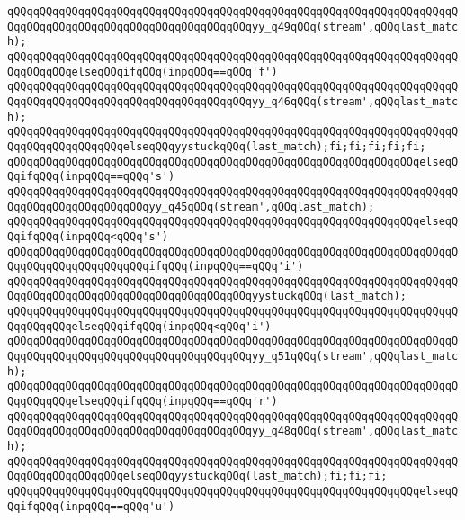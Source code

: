 \verb|qQQqqQQqqQQqqQQqqQQqqQQqqQQqqQQqqQQqqQQqqQQqqQQqqQQqqQQqqQQqqQQqqQQqqQQqqQQqqQQqqQQqqQQqqQQqqQQqqQQqqQQqqQQqyy_q49qQQq(stream',qQQqlast_match);|\newline
\verb|qQQqqQQqqQQqqQQqqQQqqQQqqQQqqQQqqQQqqQQqqQQqqQQqqQQqqQQqqQQqqQQqqQQqqQQqqQQqqQQqelseqQQqifqQQq(inpqQQq==qQQq'f')|\newline
\verb|qQQqqQQqqQQqqQQqqQQqqQQqqQQqqQQqqQQqqQQqqQQqqQQqqQQqqQQqqQQqqQQqqQQqqQQqqQQqqQQqqQQqqQQqqQQqqQQqqQQqqQQqqQQqyy_q46qQQq(stream',qQQqlast_match);|\newline
\verb|qQQqqQQqqQQqqQQqqQQqqQQqqQQqqQQqqQQqqQQqqQQqqQQqqQQqqQQqqQQqqQQqqQQqqQQqqQQqqQQqqQQqqQQqelseqQQqyystuckqQQq(last_match);fi;fi;fi;fi;fi;|\newline
\verb|qQQqqQQqqQQqqQQqqQQqqQQqqQQqqQQqqQQqqQQqqQQqqQQqqQQqqQQqqQQqqQQqelseqQQqifqQQq(inpqQQq==qQQq's')|\newline
\verb|qQQqqQQqqQQqqQQqqQQqqQQqqQQqqQQqqQQqqQQqqQQqqQQqqQQqqQQqqQQqqQQqqQQqqQQqqQQqqQQqqQQqqQQqqQQqyy_q45qQQq(stream',qQQqlast_match);|\newline
\verb|qQQqqQQqqQQqqQQqqQQqqQQqqQQqqQQqqQQqqQQqqQQqqQQqqQQqqQQqqQQqqQQqelseqQQqifqQQq(inpqQQq<qQQq's')|\newline
\verb|qQQqqQQqqQQqqQQqqQQqqQQqqQQqqQQqqQQqqQQqqQQqqQQqqQQqqQQqqQQqqQQqqQQqqQQqqQQqqQQqqQQqqQQqqQQqifqQQq(inpqQQq==qQQq'i')|\newline
\verb|qQQqqQQqqQQqqQQqqQQqqQQqqQQqqQQqqQQqqQQqqQQqqQQqqQQqqQQqqQQqqQQqqQQqqQQqqQQqqQQqqQQqqQQqqQQqqQQqqQQqqQQqqQQqyystuckqQQq(last_match);|\newline
\verb|qQQqqQQqqQQqqQQqqQQqqQQqqQQqqQQqqQQqqQQqqQQqqQQqqQQqqQQqqQQqqQQqqQQqqQQqqQQqqQQqelseqQQqifqQQq(inpqQQq<qQQq'i')|\newline
\verb|qQQqqQQqqQQqqQQqqQQqqQQqqQQqqQQqqQQqqQQqqQQqqQQqqQQqqQQqqQQqqQQqqQQqqQQqqQQqqQQqqQQqqQQqqQQqqQQqqQQqqQQqqQQqyy_q51qQQq(stream',qQQqlast_match);|\newline
\verb|qQQqqQQqqQQqqQQqqQQqqQQqqQQqqQQqqQQqqQQqqQQqqQQqqQQqqQQqqQQqqQQqqQQqqQQqqQQqqQQqelseqQQqifqQQq(inpqQQq==qQQq'r')|\newline
\verb|qQQqqQQqqQQqqQQqqQQqqQQqqQQqqQQqqQQqqQQqqQQqqQQqqQQqqQQqqQQqqQQqqQQqqQQqqQQqqQQqqQQqqQQqqQQqqQQqqQQqqQQqqQQqyy_q48qQQq(stream',qQQqlast_match);|\newline
\verb|qQQqqQQqqQQqqQQqqQQqqQQqqQQqqQQqqQQqqQQqqQQqqQQqqQQqqQQqqQQqqQQqqQQqqQQqqQQqqQQqqQQqqQQqelseqQQqyystuckqQQq(last_match);fi;fi;fi;|\newline
\verb|qQQqqQQqqQQqqQQqqQQqqQQqqQQqqQQqqQQqqQQqqQQqqQQqqQQqqQQqqQQqqQQqelseqQQqifqQQq(inpqQQq==qQQq'u')|\newline
